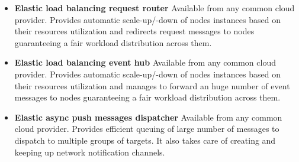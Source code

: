 \begin{itemize}
\begin{itemize}
\item{\textbf{Elastic load balancing request router}}\newline
Available from any common cloud provider. Provides automatic scale-up/-down of nodes instances based on their resources utilization and redirects request messages to nodes guaranteeing a fair workload distribution across them.
\item{\textbf{Elastic load balancing event hub}}\newline
Available from any common cloud provider. Provides automatic scale-up/-down of nodes instances based on their resources utilization and manages to forward an huge number of event messages to nodes guaranteeing a fair workload distribution across them.
\item{\textbf{Elastic async push messages dispatcher}}\newline
Available from any common cloud provider. Provides efficient queuing of large number of messages to dispatch to multiple groups of targets. It also takes care of creating and keeping up network notification channels.
\end{itemize}


\end{itemize}
